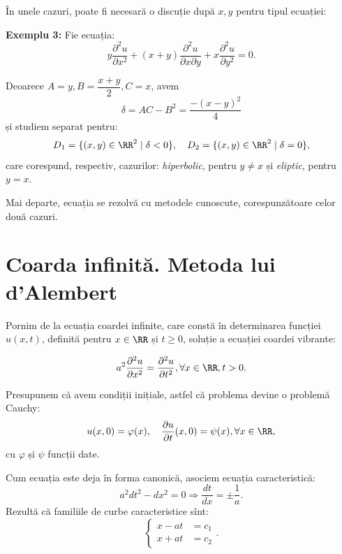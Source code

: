 \vspace{0.3cm}

În unele cazuri, poate fi necesară o discuție după $ x, y $ pentru tipul ecuației:

\textbf{Exemplu 3:} Fie ecuația:
\[
  y \dfrac{\partial^2 u}{\partial x^2} + (x + y) \dfrac{\partial^2 u}{\partial x\partial y} + %
  x \dfrac{\partial^2 u}{\partial y^2} = 0.
\]

Deoarece $ A = y, B = \dfrac{x + y}{2}, C = x $, avem
\[
  \delta = AC - B^2 = \dfrac{-(x - y)^2}{4}
\]
și studiem separat pentru:
\[
  D_1 = \{(x, y) \in \RR^2 \mid \delta < 0 \}, \quad %
  D_2 = \{(x, y) \in \RR^2 \mid \delta = 0 \},
\]
care corespund, respectiv, cazurilor: \emph{hiperbolic}, pentru $ y \neq x $ și
\emph{eliptic}, pentru $ y = x $.

Mai departe, ecuația se rezolvă cu metodele cunoscute, corespunzătoare celor
două cazuri.


\section{Coarda infinită. Metoda lui d'Alembert}

\indent\indent Pornim de la ecuația coardei infinite, care constă în determinarea funcției
$ u(x, t) $, definită pentru $ x \in \RR $ și $ t \geq 0 $, soluție a ecuației
coardei vibrante:

\[
  a^2 \dfrac{\partial^2 u}{\partial x^2} = \dfrac{\partial^2 u}{\partial t^2}, %
  \forall x \in \RR, t > 0.
\]

Presupunem că avem condiții inițiale, astfel că problema devine o problemă Cauchy:
\[
  u(x, 0) = \varphi(x), \quad \dfrac{\partial u}{\partial t}(x, 0) = \psi(x), \forall x \in \RR,
\]
cu $ \varphi $ și $ \psi $ funcții date.

Cum ecuația este deja în forma canonică, asociem ecuația caracteristică:
\[
  a^2 dt^2 - dx^2 = 0 \Rightarrow \dfrac{dt}{dx} = \pm\dfrac{1}{a}.
\]
Rezultă că familiile de curbe caracteristice sînt:
\[
  \begin{cases}
    x - at &= c_1 \\
    x + at &= c_2
  \end{cases}.
\]


